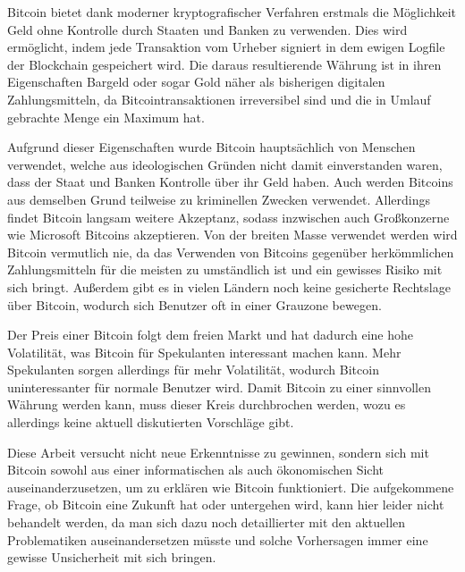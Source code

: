 Bitcoin bietet dank moderner kryptografischer Verfahren erstmals die Möglichkeit Geld ohne Kontrolle durch Staaten und Banken zu verwenden.
Dies wird ermöglicht, indem jede Transaktion vom Urheber signiert in dem ewigen Logfile der Blockchain gespeichert wird.
Die daraus resultierende Währung ist in ihren Eigenschaften Bargeld oder sogar Gold näher als bisherigen digitalen Zahlungsmitteln, da Bitcointransaktionen irreversibel sind und die in Umlauf gebrachte Menge ein Maximum hat.

Aufgrund dieser Eigenschaften wurde Bitcoin hauptsächlich von Menschen verwendet, welche aus ideologischen Gründen nicht damit einverstanden waren, dass der Staat und Banken Kontrolle über ihr Geld haben.
Auch werden Bitcoins aus demselben Grund teilweise zu kriminellen Zwecken verwendet.
Allerdings findet Bitcoin langsam weitere Akzeptanz, sodass inzwischen auch Großkonzerne wie Microsoft Bitcoins akzeptieren.
Von der breiten Masse verwendet werden wird Bitcoin vermutlich nie, da das Verwenden von Bitcoins gegenüber herkömmlichen Zahlungsmitteln für die meisten zu umständlich ist und ein gewisses Risiko mit sich bringt.
Außerdem gibt es in vielen Ländern noch keine gesicherte Rechtslage über Bitcoin, wodurch sich Benutzer oft in einer Grauzone bewegen.

Der Preis einer Bitcoin folgt dem freien Markt und hat dadurch eine hohe Volatilität, was Bitcoin für Spekulanten interessant machen kann.
Mehr Spekulanten sorgen allerdings für mehr Volatilität, wodurch Bitcoin uninteressanter für normale Benutzer wird.
Damit Bitcoin zu einer sinnvollen Währung werden kann, muss dieser Kreis durchbrochen werden, wozu es allerdings keine aktuell diskutierten Vorschläge gibt.

Diese Arbeit versucht nicht neue Erkenntnisse zu gewinnen, sondern sich mit Bitcoin sowohl aus einer informatischen als auch ökonomischen Sicht auseinanderzusetzen, um zu erklären wie Bitcoin funktioniert.
Die aufgekommene Frage, ob Bitcoin eine Zukunft hat oder untergehen wird, kann hier leider nicht behandelt werden, da man sich dazu noch detaillierter mit den aktuellen Problematiken auseinandersetzen müsste und solche Vorhersagen immer eine gewisse Unsicherheit mit sich bringen.
